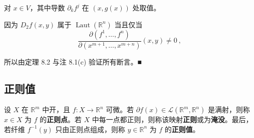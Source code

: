 \begin{corollary}
对 $ x\in V $，其中导数 $ \partial_{k}f^{j} $ 在 $ (x,g(x)) $ 处取值。

\proofhead
因为 $ D_{2}f(x,y) $ 属于 $ \operatorname{Laut}(\mathbb{R}^{n}) $ 当且仅当
\[
\frac{\partial(f^{1},\ldots,f^{n})}{\partial(x^{m+1},\ldots,x^{m+n})}(x,y)\ne 0\ ,
\]

所以由定理 8.2 与注 8.1(c) 验证所有断言。\nobreak\hspace{0.35em}■

\end{corollary}

\subsection*{正则值}

设 $ X $ 在 $ \mathbb{R}^{m} $ 中开，且 $ f:X\to\mathbb{R}^{n} $ 可微。若 $ \partial f(x)\in\mathcal{L}(\mathbb{R}^{m},\mathbb{R}^{n}) $ 是满射，则称 $ x\in X $ 为 $ f $ 的\textbf{正则点}。若 $ X $ 中每一点都正则，则称该映射\textbf{正则}或为\textbf{淹没}。最后，若纤维 $ f^{-1}(y) $ 只由正则点组成，则称 $ y\in\mathbb{R}^{n} $ 为 $ f $ 的\textbf{正则值}。

